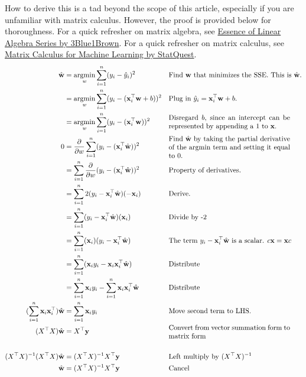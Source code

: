     How to derive this is a tad beyond the scope of this article, especially if you are unfamiliar with matrix calculus. However, the proof is provided below for thoroughness. For a quick refresher on matrix algebra, see \href{https://www.youtube.com/playlist?list=PLZHQObOWTQDNU6R1_67000Dx_ZCJB-3pi}{Essence of Linear Algebra Series by 3Blue1Brown}. For a quick refresher on matrix calculus, see \href{https://www.youtube.com/watch?v=tIkzL4jlt8g}{Matrix Calculus for Machine Learning by StatQuest}.
    \begin{align*}
        \hat{\textbf{w}} &= \argmin_w \sum_{i=1}^n (y_i - \hat{y}_i)^2 && \text{Find $\textbf{w}$ that minimizes the SSE. This is $\hat{\textbf{w}}$.}\\
        &= \argmin_w \sum_{i=1}^n (y_i - (\textbf{x}_i^{\top}\textbf{w} + b))^2 && \text{Plug in $\hat{y}_i = \textbf{x}_i^{\top}\textbf{w} + b$.}\\
        &= \argmin_w \sum_{i=1}^n (y_i - (\textbf{x}_i^{\top}\textbf{w}))^2 && \text{\parbox{0.5\textwidth}{Disregard $b$, since an intercept can be represented by appending a 1 to $\textbf{x}$.}}\\
        0 &= \frac{\partial}{\partial w} \sum_{i=1}^n (y_i - (\textbf{x}_i^{\top}\hat{\textbf{w}}))^2 && \text{\parbox{0.5\textwidth}{Find $\hat{\textbf{w}}$ by taking the partial derivative of the argmin term and setting it equal to 0.}}\\
        &= \sum_{i=1}^n \frac{\partial}{\partial w} (y_i - (\textbf{x}_i^{\top}\hat{\textbf{w}}))^2 && \text{Property of derivatives.}\\
        &= \sum_{i=1}^n 2(y_i - \textbf{x}_i^{\top}\hat{\textbf{w}})(-\textbf{x}_i) && \text{Derive.}\\
        &= \sum_{i=1}^n (y_i - \textbf{x}_i^{\top}\hat{\textbf{w}})(
        \textbf{x}_i) && \text{Divide by -2}\\
        &= \sum_{i=1}^n (
        \textbf{x}_i)(y_i - \textbf{x}_i^{\top}\hat{\textbf{w}}) && \text{The term $y_i - \textbf{x}_i^{\top}\hat{\textbf{w}}$ is a scalar. $c\textbf{x} = \textbf{x}c$}\\
        &= \sum_{i=1}^n (\textbf{x}_iy_i - \textbf{x}_i\textbf{x}_i^{\top}\hat{\textbf{w}}) && \text{Distribute}\\
        &= \sum_{i=1}^n \textbf{x}_iy_i - \sum_{i=1}^n \textbf{x}_i\textbf{x}_i^{\top}\hat{\textbf{w}} && \text{Distribute}\\
        (\sum_{i=1}^n \textbf{x}_i\textbf{x}_i^{\top})\hat{\textbf{w}} &= \sum_{i=1}^n \textbf{x}_iy_i && \text{Move second term to LHS.}\\
        (X^{\top}X)\hat{\textbf{w}} &= X^{\top}\textbf{y} && \text{\parbox{0.5\textwidth}{Convert from vector summation form to matrix form}}\\\\
        (X^{\top}X)^{-1}(X^{\top}X)\hat{\textbf{w}} &= (X^{\top}X)^{-1}X^{\top}\textbf{y} && \text{Left multiply by $(X^{\top}X)^{-1}$}\\
        \hat{\textbf{w}} &= (X^{\top}X)^{-1}X^{\top}\textbf{y} && \text{Cancel}\\
    \end{align*}

